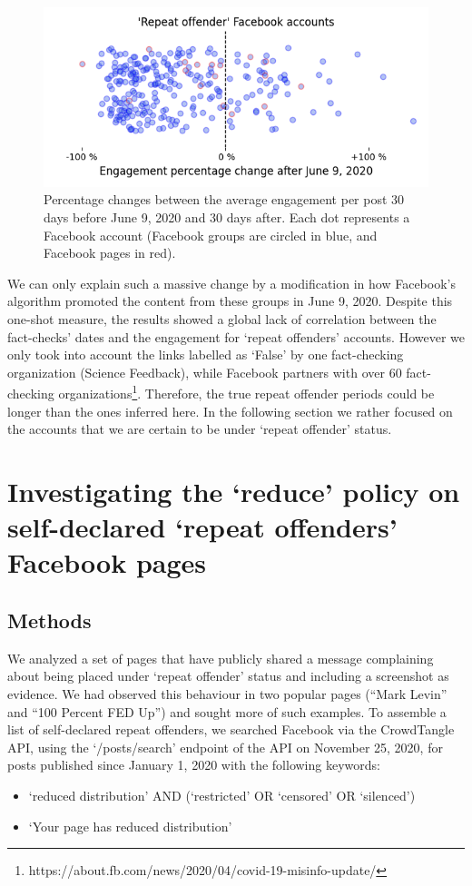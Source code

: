 \documentclass[11pt,a4paper]{article}
\begin{document}
\begin{figure}[!h]
\centering
\includegraphics[width=\linewidth]{./../figure/repeat_june_drop_percentage_change.png}
\caption{Percentage changes between the average engagement per post 30 days before June 9, 2020 and 30 days after. Each dot represents a Facebook account (Facebook groups are circled in blue, and Facebook pages in red).}
\label{repeat_june_drop_percentage_change}
\end{figure}

We can only explain such a massive change by a modification in how Facebook’s algorithm promoted the content from these groups in June 9, 2020.
Despite this one-shot measure, the results showed a global lack of correlation between the fact-checks' dates and the engagement for `repeat offenders' accounts.
However we only took into account the links labelled as `False' by one fact-checking organization (Science Feedback), while Facebook partners with over 60 fact-checking organizations\footnote{https://about.fb.com/news/2020/04/covid-19-misinfo-update/}.
Therefore, the true repeat offender periods could be longer than the ones inferred here.
In the following section we rather focused on the accounts that we are certain to be under `repeat offender' status. 

\section{Investigating the `reduce’ policy on self-declared ‘repeat offenders’ Facebook pages}

\subsection{Methods}

We analyzed a set of pages that have publicly shared a message complaining about being placed under ‘repeat offender’ status and including a screenshot as evidence. 
We had observed this behaviour in two popular pages (“Mark Levin” and “100 Percent FED Up”) and sought more of such examples. 
To assemble a list of self-declared repeat offenders, we searched Facebook via the CrowdTangle API, using the `/posts/search' endpoint of the API on November 25, 2020, for posts published since January 1, 2020 with the following keywords:
\begin{itemize}
\item `reduced distribution' AND (`restricted' OR `censored' OR `silenced')
\item `Your page has reduced distribution'
\end{itemize}
\end{document}
